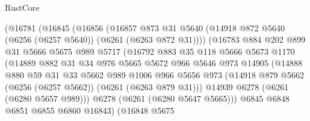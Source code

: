 \begin{lexlean}{RustCore}
\begin{coremodule}
                      (@16781
                        (@16845
                          (@16856
                            (@16857
                              @873
                              @31
                              @5640
                              (@14918 @872 @5640 (@6256 (@6257 @5640)) (@6261 (@6263 @872 @31))))
                            (@16783
                              @884
                              @202
                              @899
                              @31
                              @5666
                              @5675
                              @989
                              @5717
                              (@16792
                                @883
                                @35
                                @118
                                @5666
                                @5673
                                @1170
                                (@14889
                                  @882
                                  @31
                                  @34
                                  @976
                                  @5665
                                  @5672
                                  @966
                                  @5646
                                  @973
                                  @14905
                                  (@14888
                                    @880
                                    @59
                                    @31
                                    @33
                                    @5662
                                    @989
                                    @1006
                                    @966
                                    @5656
                                    @973
                                    (@14918
                                      @879
                                      @5662
                                      (@6256 (@6257 @5662))
                                      (@6261 (@6263 @879 @31)))
                                    @14939
                                    @6278
                                    (@6261 (@6280 @5657 @989)))
                                  @6278
                                  (@6261 (@6280 @5647 @5665)))
                                @6845
                                @6848
                                @6851
                                @6855
                                @6860
                                @16843)
                              (@16848
                                @5675

\end{coremodule}
\end{lexlean}
